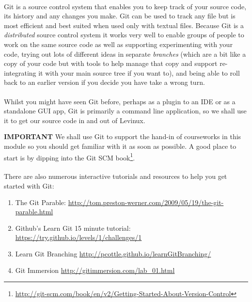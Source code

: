 \documentclass[12pt, a4paper, twoside]{book}
\begin{document}
\paragraph{} Git is a source control system that enables you to keep track of your source code, its history and any changes you make. Git can be used to track any file but is most efficient and best suited when used only with textual files. Because Git is a \emph{distributed} source control system it works very well to enable groups of people to work on the same source code as well as supporting experimenting with your code, trying out lots of different ideas in separate \emph{branches} (which are a bit like a copy of your code but with tools to help manage that copy and support re-integrating it with your main source tree if you want to), and being able to roll back to an earlier version if you decide you have take a wrong turn.

\paragraph{} Whilst you might have seen Git before, perhaps as a plugin to an IDE or as a standalone GUI app, Git is primarily a command line application, so we shall use it to get our source code in and out of Levinux.

\textbf{IMPORTANT} We shall use Git to support the hand-in of courseworks in this module so you should get familiar with it as soon as possible. A good place to start is by dipping into the Git SCM book\footnote{\url{http://git-scm.com/book/en/v2/Getting-Started-About-Version-Control}}.

\paragraph{} There are also numerous interactive tutorials and resources to help you get started with Git:
\begin{enumerate}
\item The Git Parable: \url{http://tom.preston-werner.com/2009/05/19/the-git-parable.html}
\item Github's Learn Git 15 minute tutorial: \url{https://try.github.io/levels/1/challenges/1}
\item Learn Git Branching \url{http://pcottle.github.io/learnGitBranching/}
\item Git Immersion \url{http://gitimmersion.com/lab_01.html}
\end{enumerate}
\end{document}
